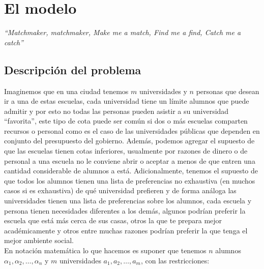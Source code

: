 \chapter{El modelo}
\begin{flushright}
\textit{``Matchmaker, matchmaker,
Make me a match, Find me a find,
Catch me a catch''}
\end{flushright}
\section{Descripción del problema}
Imaginemos que en una ciudad tenemos $m$ universidades y $n$ personas que desean ir a una de estas escuelas, cada universidad tiene un límite alumnos que puede admitir y por esto no todas las personas pueden asistir a su universidad
 ``favorita'', este tipo de cota puede ser común si dos o más escuelas comparten recursos o personal como es el caso de las universidades públicas que dependen en conjunto del presupuesto del gobierno. 
Además, podemos agregar el supuesto de que las escuelas tienen cotas inferiores, usualmente por razones de dinero o de personal a una escuela no le conviene abrir o aceptar a menos de que entren una cantidad considerable de alumnos a está. Adicionalmente, tenemos el supuesto de que todos los alumnos tienen una lista de preferencias no exhaustiva (en muchos casos si es exhaustiva) de qué universidad prefieren y de forma análoga las universidades tienen una lista de preferencias sobre los alumnos, cada escuela y persona tienen necesidades diferentes a los demás, algunos podrían preferir la escuela que está más cerca de sus casas, otros la que te prepara mejor académicamente y otros entre muchas razones podrían preferir la que tenga el mejor ambiente social. 
\\ En notación matemática lo que hacemos es suponer que tenemos $n$ alumnos $\alpha_1, \alpha_2, \ldots, \alpha_n$ y $m$ universidades $a_1, a_2, \ldots, a_m$, con las restricciones: 

